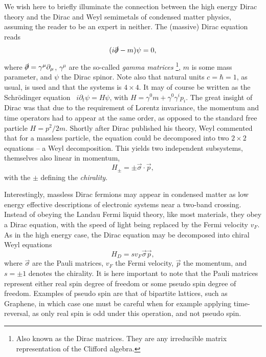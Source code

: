 We wish here to briefly illuminate the connection between the high energy Dirac theory and the Dirac and Weyl semimetals of condensed matter physics, assuming the reader to be an expert in neither.
The (massive) Dirac equation reads
\begin{equation}
  (i \slashed{\partial} - m ) \psi = 0,
\end{equation}
where \( \slashed{\partial} = \gamma^{\mu} \partial_{\mu} \), \( \gamma^{\mu} \) are the so-called \emph{gamma matrices}%
\footnote{Also known as the Dirac matrices. They are any irreducible matrix representation of the Clifford algebra.}, \( m \) is some mass parameter, and \( \psi \) the Dirac spinor.
Note also that natural units \( c = \hbar = 1 \), as usual, is used and that the systems is \( 4\times 4 \).
It may of course be written as the Schrödinger equation~\cite{chernodubThermalTransportGeometry2021} \( i \partial_t \psi = H \psi \), with \( H = \gamma^0 m + \gamma^0\gamma^ip_i \).
The great insight of Dirac was that due to the requirement of Lorentz invariance, the momentum and time operators had to appear at the same order, as opposed to the standard free particle \( H = p^2 /2m \).
Shortly after Dirac published his theory, Weyl commented that for a massless particle, the equation could be decomposed into two \( 2 \times 2 \) equations -- a Weyl decomposition.
This yields two independent subsystems, themselves also linear in momentum,
\begin{equation}
  \label{eq:156}
  H_{\pm} = \pm \vec{\sigma} \cdot \vec{p},
\end{equation}
with the \( \pm \) defining the \emph{chirality}.

Interestingly, massless Dirac fermions may appear in condensed matter as low energy effective descriptions of electronic systems near a two-band crossing.
Instead of obeying the Landau Fermi liquid theory, like most materials, they obey a Dirac equation, with the speed of light being replaced by the Fermi velocity $v_F$.
As in the high energy case, the Dirac equation may be decomposed into chiral Weyl equations
\begin{equation}
  \label{eq:3}
H_D = s v_{F} \vec{\sigma} \vec{p},
\end{equation}
where $\vec{\sigma}$ are the Pauli matrices, $v_F$ the Fermi velocity, $\vec{p}$ the momentum, and $s=\pm 1$ denotes the chirality.
It is here important to note that the Pauli matrices represent either real spin degree of freedom or some pseudo spin degree of freedom.
Examples of pseudo spin are that of bipartite lattices, such as Graphene, in which case one must be careful when for example applying time-reversal, as only real spin is odd under this operation, and not pseudo spin.

